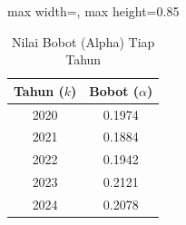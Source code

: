 \begin{table}[H]
\centering
\caption{Nilai Bobot (Alpha) Tiap Tahun} \label{tab:appalpha}
\begin{adjustbox}{max width=\textwidth, max height=0.85\textheight}
\begin{tabular}{|c|c|}
\hline
\textbf{Tahun ($k$)} & \textbf{Bobot ($\alpha$)} \\
\hline
2020 & 0.1974 \\
2021 & 0.1884 \\
2022 & 0.1942 \\
2023 & 0.2121 \\
2024 & 0.2078 \\
\hline
\end{tabular}
\end{adjustbox}
\end{table}